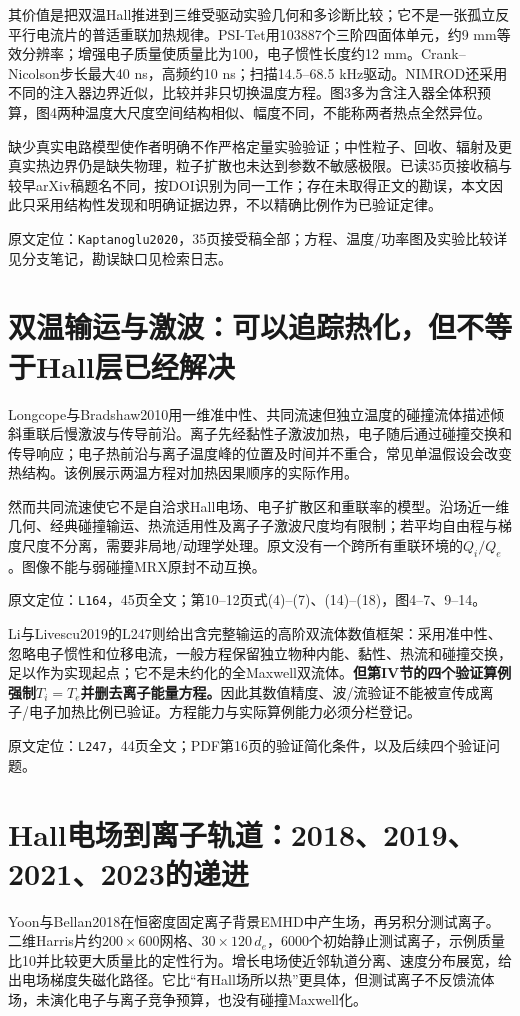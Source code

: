 \documentclass[UTF8,a4paper,11pt,openany,fontset=fandol]{ctexbook}
\newcommand{\loc}[2]{\par\noindent\textsf{原文定位：}\texttt{#1}，#2。\par}
\begin{document}
其价值是把双温Hall推进到三维受驱动实验几何和多诊断比较；它不是一张孤立反平行电流片的普适重联加热规律。PSI-Tet用103887个三阶四面体单元，约9 mm等效分辨率；增强电子质量使质量比为100，电子惯性长度约12 mm。Crank--Nicolson步长最大40 ns，高频约10 ns；扫描14.5--68.5 kHz驱动。NIMROD还采用不同的注入器边界近似，比较并非只切换温度方程。图3多为含注入器全体积预算，图4两种温度大尺度空间结构相似、幅度不同，不能称两者热点全然异位。

缺少真实电路模型使作者明确不作严格定量实验验证；中性粒子、回收、辐射及更真实热边界仍是缺失物理，粒子扩散也未达到参数不敏感极限。已读35页接收稿与较早arXiv稿题名不同，按DOI识别为同一工作；存在未取得正文的勘误，本文因此只采用结构性发现和明确证据边界，不以精确比例作为已验证定律。
\loc{Kaptanoglu2020}{35页接受稿全部；方程、温度/功率图及实验比较详见分支笔记，勘误缺口见检索日志}

\section{双温输运与激波：可以追踪热化，但不等于Hall层已经解决}
Longcope与Bradshaw2010用一维准中性、共同流速但独立温度的碰撞流体描述倾斜重联后慢激波与传导前沿。离子先经黏性子激波加热，电子随后通过碰撞交换和传导响应；电子热前沿与离子温度峰的位置及时间并不重合，常见单温假设会改变热结构。该例展示两温方程对加热因果顺序的实际作用。\citep{L164}

然而共同流速使它不是自洽求Hall电场、电子扩散区和重联率的模型。沿场近一维几何、经典碰撞输运、热流适用性及离子子激波尺度均有限制；若平均自由程与梯度尺度不分离，需要非局地/动理学处理。原文没有一个跨所有重联环境的$Q_i/Q_e$。图像不能与弱碰撞MRX原封不动互换。
\loc{L164}{45页全文；第10--12页式(4)--(7)、(14)--(18)，图4--7、9--14}

Li与Livescu2019的L247则给出含完整输运的高阶双流体数值框架：采用准中性、忽略电子惯性和位移电流，一般方程保留独立物种内能、黏性、热流和碰撞交换，足以作为实现起点；它不是未约化的全Maxwell双流体。\textbf{但第IV节的四个验证算例强制$T_i=T_e$并删去离子能量方程。}因此其数值精度、波/流验证不能被宣传成离子/电子加热比例已验证。方程能力与实际算例能力必须分栏登记。\citep{L247}
\loc{L247}{44页全文；PDF第16页的验证简化条件，以及后续四个验证问题}

\section{Hall电场到离子轨道：2018、2019、2021、2023的递进}
Yoon与Bellan2018在恒密度固定离子背景EMHD中产生场，再另积分测试离子。二维Harris片约$200\times600$网格、$30\times120\,d_e$，6000个初始静止测试离子，示例质量比10并比较更大质量比的定性行为。增长电场使近邻轨道分离、速度分布展宽，给出电场梯度失磁化路径。它比“有Hall场所以热”更具体，但测试离子不反馈流体场，未演化电子与离子竞争预算，也没有碰撞Maxwell化。\citep{Yoon2018Heating}
\end{document}
